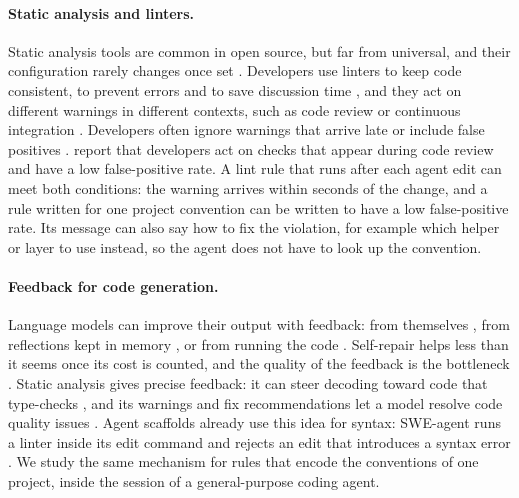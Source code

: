 \documentclass[pdflatex,sn-basic]{sn-jnl}
\begin{document}
\paragraph{Static analysis and linters.}
Static analysis tools are common in open source, but far from universal, and their configuration rarely changes once set \citep{beller2016static}.
Developers use linters to keep code consistent, to prevent errors and to save discussion time \citep{tomasdottir2017linters}, and they act on different warnings in different contexts, such as code review or continuous integration \citep{vassallo2020static}.
Developers often ignore warnings that arrive late or include false positives \citep{johnson2013static,sadowski2018google}.
\citet{sadowski2018google} report that developers act on checks that appear during code review and have a low false-positive rate.
A lint rule that runs after each agent edit can meet both conditions: the warning arrives within seconds of the change, and a rule written for one project convention can be written to have a low false-positive rate.
Its message can also say how to fix the violation, for example which helper or layer to use instead, so the agent does not have to look up the convention.

\paragraph{Feedback for code generation.}
Language models can improve their output with feedback: from themselves \citep{madaan2023selfrefine}, from reflections kept in memory \citep{shinn2023reflexion}, or from running the code \citep{chen2024selfdebug}.
Self-repair helps less than it seems once its cost is counted, and the quality of the feedback is the bottleneck \citep{olausson2024selfrepair}.
Static analysis gives precise feedback: it can steer decoding toward code that type-checks \citep{agrawal2023monitors}, and its warnings and fix recommendations let a model resolve code quality issues \citep{wadhwa2024core,liu2024refining}.
Agent scaffolds already use this idea for syntax: SWE-agent runs a linter inside its edit command and rejects an edit that introduces a syntax error \citep{yang2024sweagent}.
We study the same mechanism for rules that encode the conventions of one project, inside the session of a general-purpose coding agent.
\end{document}
